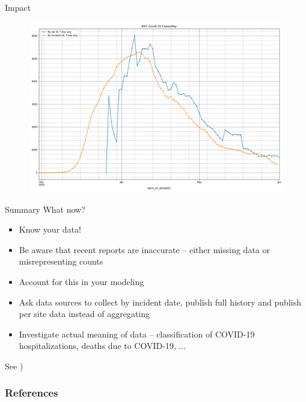 \documentclass[aspectratio=169]{beamer}
\begin{document}
\begin{frame}{Impact}
  \begin{figure}
    \centering
    \includegraphics[height=.8\textheight]{../Notebooks/casesPerDayHistoryRptDtVsInDt.png}
  \end{figure}
\end{frame}

\begin{frame}{Summary}
  What now?
  \begin{itemize}
  \item Know your data!
  \item Be aware that recent reports are inaccurate -- either missing
    data or misrepresenting counts
  \item Account for this in your modeling
  \item Ask data sources to collect by incident date, publish full
    history and publish per site data instead of aggregating
  \item Investigate actual meaning of data -- classification of COVID-19
    hospitalizations, deaths due to COVID-19, ...
  \end{itemize}

  See ) 
\end{frame}

\begin{frame}[allowframebreaks]
  \frametitle{References}
  \label{refs}
  \begin{small}
  \printbibliography
  \end{small}
\vfil
\vbox{\hbox{}
}%
\end{frame}
\end{document}
